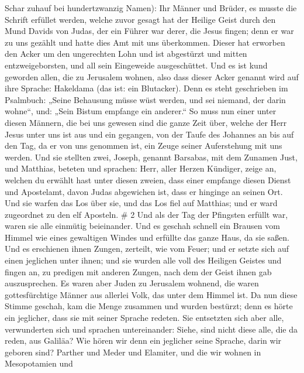 Schar zuhauf bei hundertzwanzig Namen):  Ihr Männer und
Brüder, es musste die Schrift erfüllet werden, welche zuvor gesagt hat
der Heilige Geist durch den Mund Davids von Judas, der ein Führer war
derer, die Jesus fingen;  denn er war zu uns gezählt und
hatte dies Amt mit uns überkommen.  Dieser hat erworben den
Acker um den ungerechten Lohn und ist abgestürzt und mitten
entzweigeborsten, und all sein Eingeweide ausgeschüttet. 
Und es ist kund geworden allen, die zu Jerusalem wohnen, also dass
dieser Acker genannt wird auf ihre Sprache: Hakeldama (das ist: ein
Blutacker).  Denn es steht geschrieben im Psalmbuch: „Seine
Behausung müsse wüst werden, und sei niemand, der darin wohne``, und:
„Sein Bistum empfange ein anderer.``  So muss nun einer
unter diesen Männern, die bei uns gewesen sind die ganze Zeit über,
welche der Herr Jesus unter uns ist aus und ein gegangen, 
von der Taufe des Johannes an bis auf den Tag, da er von uns genommen
ist, ein Zeuge seiner Auferstehung mit uns werden.  Und sie
stellten zwei, Joseph, genannt Barsabas, mit dem Zunamen Just, und
Matthias,  beteten und sprachen: Herr, aller Herzen
Kündiger, zeige an, welchen du erwählt hast unter diesen zweien,
 dass einer empfange diesen Dienst und Apostelamt, davon
Judas abgewichen ist, dass er hinginge an seinen Ort.  Und
sie warfen das Los über sie, und das Los fiel auf Matthias; und er ward
zugeordnet zu den elf Aposteln. \# 2  Und als der Tag der
Pfingsten erfüllt war, waren sie alle einmütig beieinander. 
Und es geschah schnell ein Brausen vom Himmel wie eines gewaltigen
Windes und erfüllte das ganze Haus, da sie saßen.  Und es
erschienen ihnen Zungen, zerteilt, wie vom Feuer; und er setzte sich auf
einen jeglichen unter ihnen;  und sie wurden alle voll des
Heiligen Geistes und fingen an, zu predigen mit anderen Zungen, nach dem
der Geist ihnen gab auszusprechen.  Es waren aber Juden zu
Jerusalem wohnend, die waren gottesfürchtige Männer aus allerlei Volk,
das unter dem Himmel ist.  Da nun diese Stimme geschah, kam
die Menge zusammen und wurden bestürzt; denn es hörte ein jeglicher,
dass sie mit seiner Sprache redeten.  Sie entsetzten sich
aber alle, verwunderten sich und sprachen untereinander: Siehe, sind
nicht diese alle, die da reden, aus Galiläa?  Wie hören wir
denn ein jeglicher seine Sprache, darin wir geboren sind? 
Parther und Meder und Elamiter, und die wir wohnen in Mesopotamien und
